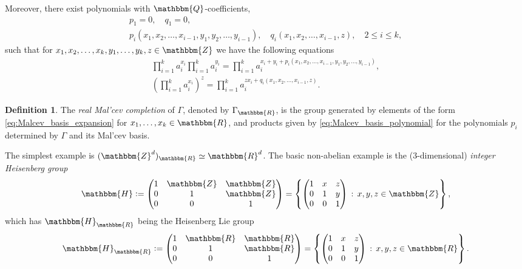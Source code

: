 \documentclass{amsart}
\numberwithin{figure}{section}
\numberwithin{equation}{section}
\numberwithin{table}{section}
\theoremstyle{plain}
\theoremstyle{definition}
\newtheorem{definition}[equation]{Definition}
\theoremstyle{remark}
\theoremstyle{nonumber}
\newcommand{\Z}{\mathbb{Z}}
\newcommand{\Q}{\mathbb{Q}}
\newcommand{\R}{\mathbb{R}}
\newcommand{\HH}{\mathbb{H}} %
\newcommand{\defeq}{\mathrel{\vcentcolon=}}
\renewcommand{\mathbb}{\mathbbm} %
\begin{document}
Moreover, there exist polynomials with \( \Q \)-coefficients, 
\begin{gather*} 
p_1=0,\quad q_1=0,\\
p_i(x_1,x_2,\dots,x_{i-1},y_1,y_2,\dots,y_{i-1}),\quad
q_i(x_1,x_2,\dots,x_{i-1},z),\quad 2\leq i\leq k,
\end{gather*}
such that for $x_1,x_2, \dots, x_k,y_1,\dots,y_k,z\in \Z$ we have the
following equations
\begin{equation}\label{eq:Malcev_basis_polynomial}
\begin{gathered}
\prod_{i=1}^ka_i^{x_i}\prod_{i=1}^ka_i^{y_i}=\prod_{i=1}^ka_i^{x_i+y_i+p_i(x_1,x_2,\dots,x_{i-1},y_1,y_2,\dots,y_{i-1})},\\
(\prod_{i=1}^ka_i^{x_i})^z=\prod_{i=1}^ka_i^{zx_i+q_i(x_1,x_2,\dots,x_{i-1},z)}.
\end{gathered}
\end{equation}

\begin{definition}\label{def:real_Malcev_completion}
The \emph{real Mal'cev completion} of \( \Gamma \), denoted by \( \Gamma_\R
\), is the group generated by elements of the form
\eqref{eq:Malcev_basis_expansion} for \( x_1,\dots,x_k\in\R \), and
products given by \eqref{eq:Malcev_basis_polynomial} for the polynomials \(
p_i\) determined by \( \Gamma \) and its Mal'cev basis.
\end{definition}


The simplest example is \( (\Z^d)_\R\simeq\R^d \). The basic non-abelian
example is the (3-dimensional) \emph{integer Heisenberg group}
\begin{equation}\label{eq:Heisenberg_integer_lattice}
\HH\defeq \begin{pmatrix}1 & \Z & \Z \\ 0 & 1 & \Z \\ 0 & 0 & 1\end{pmatrix}=\left\{\begin{pmatrix}1 & x & z \\ 0 & 1 & y \\ 0 & 0 & 1\end{pmatrix}\,:\, x,y,z\in \Z\right\},
\end{equation}
which has $\HH_\R$ being the Heisenberg Lie group
\[
\HH_\R\defeq \begin{pmatrix}1 & \R & \R \\ 0 & 1 & \R \\ 0 & 0 & 1\end{pmatrix}=\left\{\begin{pmatrix}1 & x & z \\ 0 & 1 & y \\ 0 & 0 & 1\end{pmatrix}\,:\, x,y,z\in \R\right\}.
\]
\end{document}
